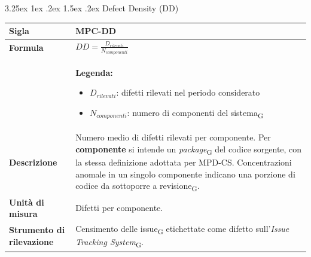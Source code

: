 \documentclass[a4paper, 10pt]{article}
\makeatletter
\renewcommand\paragraph{\@startsection{paragraph}{4}{\z@}%
  {3.25ex \@plus1ex \@minus .2ex}%
  {1.5ex \@plus .2ex}%
  {\normalfont\normalsize\bfseries}}
\makeatother
\begin{document}
\paragraph{Defect Density (DD)}
\mbox{} \\
\noindent
\begin{minipage}{\textwidth}
    \begin{tabularx}{\textwidth}{|>{\columncolor{bluBitless!10}\bfseries}p{3.5cm}|X|}
        \hline
        Sigla & MPC-DD \\ \hline
        Formula &
        \textit{$DD = \frac{D_{rilevati}}{N_{componenti}}$} \vspace{2mm} \\
        & \small \textbf{Legenda:}
        \begin{itemize}
            \item $D_{rilevati}$: difetti rilevati nel periodo considerato
            \item $N_{componenti}$: numero di componenti del sistema\textsubscript{G}
        \end{itemize} \\ \hline
        Descrizione & Numero medio di difetti rilevati per componente. Per \textbf{componente} si intende un \textit{package}\textsubscript{G} del codice sorgente, con la stessa definizione adottata per MPD-CS. Concentrazioni anomale in un singolo componente indicano una porzione di codice da sottoporre a revisione\textsubscript{G}. \\ \hline
        Unità di misura & Difetti per componente. \\ \hline
        Strumento di rilevazione & Censimento delle issue\textsubscript{G} etichettate come difetto sull'\textit{Issue Tracking System}\textsubscript{G}. \\ \hline
    \end{tabularx}
\end{minipage}

\vspace{1cm}

\end{document}

